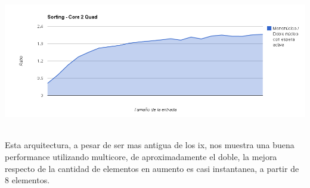 	\begin{center}
	    \includegraphics[height=6cm]{images/core2quad_sorting.png}
	\end{center}

	Esta arquitectura, a pesar de ser mas antigua de los ix, nos muestra una buena performance utilizando multicore, de aproximadamente el doble, la mejora respecto de la cantidad de elementos en aumento es casi instantanea, a partir de 8 elementos.

